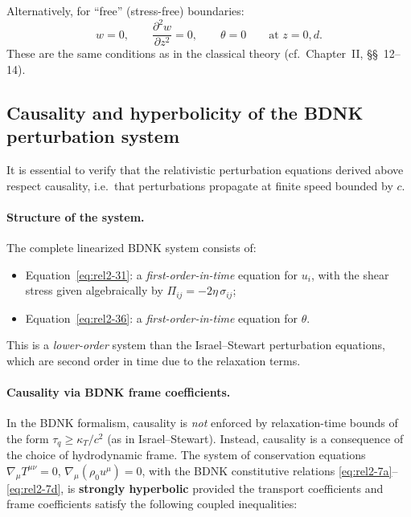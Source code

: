 Alternatively, for ``free'' (stress-free) boundaries:
\begin{equation}
\label{eq:rel2-43}
  w = 0, \qquad \frac{\partial^2 w}{\partial z^2} = 0, \qquad
  \theta = 0 \qquad \text{at } z = 0, d.
\end{equation}
These are the same conditions as in the classical theory (cf.\ Chapter~II,
\S\S~12--14).

\subsection{Causality and hyperbolicity of the BDNK perturbation system}%
\label{sec:rel9h}

It is essential to verify that the relativistic perturbation equations
derived above respect causality, i.e.\ that perturbations propagate at
finite speed bounded by $c$.

\paragraph{Structure of the system.}
The complete linearized BDNK system consists of:
\begin{itemize}
\item Equation~\eqref{eq:rel2-31}: a \emph{first-order-in-time}
  equation for $u_i$, with the shear stress given algebraically by
  $\Pi_{ij} = -2\eta\,\sigma_{ij}$;
\item Equation~\eqref{eq:rel2-36}: a \emph{first-order-in-time}
  equation for $\theta$.
\end{itemize}
This is a \emph{lower-order} system than the Israel--Stewart perturbation
equations, which are second order in time due to the relaxation terms.

\paragraph{Causality via BDNK frame coefficients.}
In the BDNK formalism, causality is \emph{not} enforced by relaxation-time
bounds of the form $\tau_q \ge \kappa_T/c^2$ (as in Israel--Stewart).
Instead, causality is a consequence of the choice of hydrodynamic frame.
The system of conservation equations $\nabla_\mu T^{\mu\nu} = 0$,
$\nabla_\mu(\rho_0 u^\mu) = 0$, with the BDNK constitutive relations
\eqref{eq:rel2-7a}--\eqref{eq:rel2-7d}, is \textbf{strongly hyperbolic}
provided the transport coefficients and frame coefficients satisfy
the following coupled inequalities:

